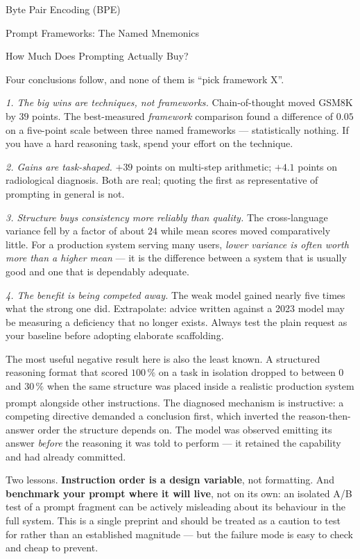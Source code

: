 \begin{v3topic}{Byte Pair Encoding (BPE)}
\begin{v3topic}{Prompt Frameworks: The Named Mnemonics}
\begin{v3topic}{How Much Does Prompting Actually Buy?}
\begin{workedexample}
Four conclusions follow, and none of them is ``pick framework X''.

\emph{1. The big wins are techniques, not frameworks.} Chain-of-thought moved
GSM8K by $39$ points. The best-measured \emph{framework} comparison found a
difference of $0.05$ on a five-point scale between three named frameworks ---
statistically nothing. If you have a hard reasoning task, spend your effort on
the technique.

\emph{2. Gains are task-shaped.} $+39$ points on multi-step arithmetic;
$+4.1$ points on radiological diagnosis. Both are real; quoting the first as
representative of prompting in general is not.

\emph{3. Structure buys consistency more reliably than quality.} The
cross-language variance fell by a factor of about $24$ while mean scores moved
comparatively little. For a production system serving many users, \emph{lower
variance is often worth more than a higher mean} --- it is the difference
between a system that is usually good and one that is dependably adequate.

\emph{4. The benefit is being competed away.} The weak model gained nearly five
times what the strong one did. Extrapolate: advice written against a 2023 model
may be measuring a deficiency that no longer exists. Always test the plain
request as your baseline before adopting elaborate scaffolding.
\end{workedexample}

\begin{cautionbox}
The most useful negative result here is also the least known. A structured
reasoning format that scored $100\,\%$ on a task in isolation dropped to
between $0$ and $30\,\%$ when the same structure was placed inside a realistic
production system prompt alongside other
instructions\textsuperscript{\cite{joPromptComplexityDilutes2026}}. The
diagnosed mechanism is instructive: a competing directive demanded a
conclusion first, which inverted the reason-then-answer order the structure
depends on. The model was observed emitting its answer \emph{before} the
reasoning it was told to perform --- it retained the capability and had already
committed.

Two lessons. \textbf{Instruction order is a design variable}, not formatting.
And \textbf{benchmark your prompt where it will live}, not on its own: an
isolated A/B test of a prompt fragment can be actively misleading about its
behaviour in the full system. This is a single preprint and should be treated
as a caution to test for rather than an established magnitude --- but the
failure mode is easy to check and cheap to prevent.
\end{cautionbox}
\end{v3topic}


\end{v3topic}
\end{v3topic}
